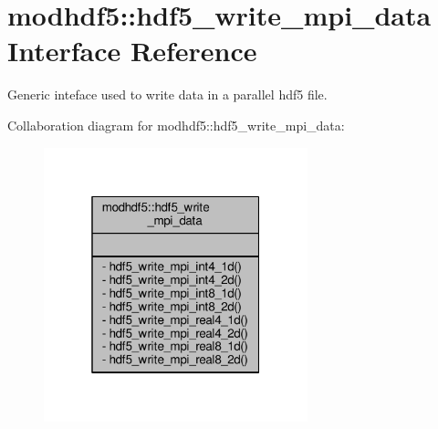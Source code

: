 \hypertarget{interfacemodhdf5_1_1hdf5__write__mpi__data}{}\section{modhdf5\+:\+:hdf5\+\_\+write\+\_\+mpi\+\_\+data Interface Reference}
\label{interfacemodhdf5_1_1hdf5__write__mpi__data}


Generic inteface used to write data in a parallel hdf5 file.  




Collaboration diagram for modhdf5\+:\+:hdf5\+\_\+write\+\_\+mpi\+\_\+data\+:\nopagebreak
\begin{figure}[H]
\begin{center}
\leavevmode
\includegraphics[width=217pt]{interfacemodhdf5_1_1hdf5__write__mpi__data__coll__graph}
\end{center}
\end{figure}
